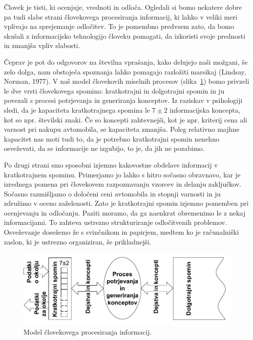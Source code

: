 Človek je tisti, ki ocenjuje, vrednoti in odloča. Ogledali si bomo nekatere dobre pa tudi slabe strani človekovega procesiranja informacij, ki lahko v veliki meri vplivajo na sprejemanje odločitev. To je pomembno predvsem zato, da bomo skušali z informacijsko tehnologijo človeku pomagati, da izkoristi svoje prednosti in zmanjša vpliv slabosti.

Čeprav je pot do odgovorov na številna vprašanja, kako delujejo naši možgani, še zelo dolga, nam obstoječa spoznanja lahko pomagajo razložiti marsikaj (Lindsay, Norman, 1977). V naš model človekovih miselnih procesov (slika~\ref{f-procesiranje-informacij}) bomo privzeli le dve vrsti človekovega spomina: kratkotrajni in dolgotrajni spomin in ju povezali s procesi potrjevanja in generiranja konceptov. Iz raziskav v psihologiji sledi, da je kapaciteta kratkotrajnega spomina le $7\pm 2$ informacijska koncepta, kot so npr. številski znaki. Če so koncepti zahtevnejši, kot je npr. kriterij cena ali varnost pri nakupu avtomobila, se kapaciteta zmanjša. Poleg relativno majhne kapacitet nas moti tudi to, da je potrebno kratkotrajni spomin nenehno osveževati, da se informacije ne izgubijo, to je, da jih ne pozabimo. 

Po drugi strani smo sposobni izjemno kakovostne obdelave informacij v kratkotrajnem spominu. Primerjamo jo lahko s hitro sočasno obravnavo, kar je izrednega pomena pri človekovem razpoznavanju vzorcev in delanju zaključkov. Sočasno razmišljamo o določeni ceni avtomobila in stopnji varnosti in ju združimo v oceno zaželenosti. Zato je kratkotrajni spomin izjemno pomemben pri ocenjevanju in odločanju. Paziti moramo, da ga naenkrat obremenimo le z nekaj informacijami. To zahteva ustrezno strukturiranje odločitvenih problemov. Osveževanje dosežemo že s svinčnikom in papirjem, medtem ko je računalniški zaslon, ki je ustrezno organiziran, še prikladnejši.

\begin{figure}[htbp]
\begin{center}
\includegraphics[width=12cm]{slike/procesiranje-informacij.pdf}
\caption{Model človekovega procesiranja informacij.}
\label{f-procesiranje-informacij}
\end{center}
\end{figure}

